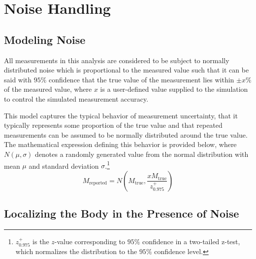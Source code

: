 \documentclass{report}
\begin{document}
		\section{Noise Handling}
			\subsection{Modeling Noise} \label{noise}
				All measurements in this analysis are considered to be subject to normally distributed noise which is proportional to the measured value such that it can be said with $95\%$ confidence that the true value of the measurement lies within $\pm{x}\%$ of the measured value, where $x$ is a user-defined value supplied to the simulation to control the simulated measurement accuracy. \par 
				This model captures the typical behavior of measurement uncertainty, that it typically represents some proportion of the true value and that repeated measurements can be assumed to be normally distributed around the true value. The mathematical expression defining this behavior is provided below, where $N(\mu, \sigma)$ denotes a randomly generated value from the normal distribution with mean $\mu$ and standard deviation $\sigma$.\footnote{$z^+_{0.975}$ is the $z$-value corresponding to $95\%$ confidence in a two-tailed z-test, which normalizes the distribution to the $95\%$ confidence level.}
				\begin{equation}
					M_{\text{reported}}=N\left(M_{\text{true}}, \frac{xM_{\text{true}}}{z^+_{0.975}}\right)
				\end{equation}
			\subsection{Localizing the Body in the Presence of Noise}
\end{document}
